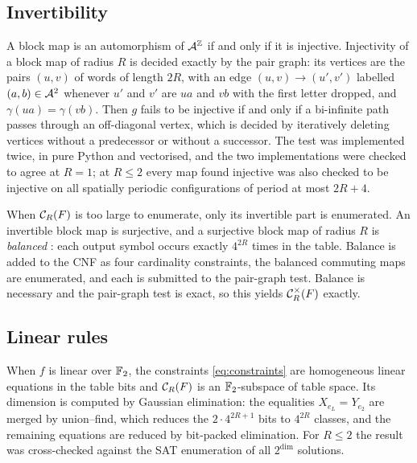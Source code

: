 \subsection{Invertibility}
A block map is an automorphism of $\mathcal{A}^{\mathbb{Z}}$ if and only if it is injective. Injectivity of a block map of radius $R$ is decided exactly by the pair graph: its vertices are the pairs $(u,v)$ of words of length $2R$, with an edge $(u,v)\to(u',v')$ labelled $(a,b)\in\mathcal{A}^2$ whenever $u'$ and $v'$ are $ua$ and $vb$ with the first letter dropped, and $\gamma(ua)=\gamma(vb)$. Then $g$ fails to be injective if and only if a bi-infinite path passes through an off-diagonal vertex, which is decided by iteratively deleting vertices without a predecessor or without a successor. The test was implemented twice, in pure Python and vectorised, and the two implementations were checked to agree at $R=1$; at $R\le2$ every map found injective was also checked to be injective on all spatially periodic configurations of period at most $2R+4$.

When $\mathcal{C}_R(F)$ is too large to enumerate, only its invertible part is enumerated. An invertible block map is surjective, and a surjective block map of radius $R$ is \emph{balanced} \cite[Theorem~5.4]{Hedlund1969}: each output symbol occurs exactly $4^{2R}$ times in the table. Balance is added to the CNF as four cardinality constraints, the balanced commuting maps are enumerated, and each is submitted to the pair-graph test. Balance is necessary and the pair-graph test is exact, so this yields $\mathcal{C}^{\times}_R(F)$ exactly.

\subsection{Linear rules}
When $f$ is linear over $\mathbb{F}_2$, the constraints \eqref{eq:constraints} are homogeneous linear equations in the table bits and $\mathcal{C}_R(F)$ is an $\mathbb{F}_2$-subspace of table space. Its dimension is computed by Gaussian elimination: the equalities $X_{e_L}=Y_{e_2}$ are merged by union--find, which reduces the $2\cdot4^{2R+1}$ bits to $4^{2R}$ classes, and the remaining equations are reduced by bit-packed elimination. For $R\le2$ the result was cross-checked against the SAT enumeration of all $2^{\dim}$ solutions.
